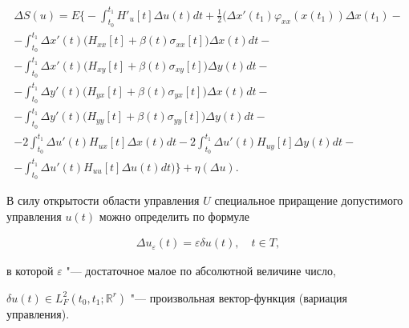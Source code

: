 \begin{multline}

\Delta S(u)=E \biggl\lbrace -\int^{t_{1}}_{t_{0}} H'_{u}[t] \Delta u(t)dt+

\frac{1}{2}  \biggl(  \Delta x'(t_{1}) \varphi_{xx}(x(t_{1})) \Delta x(t_{1})  - \\ 

- \int^{t_{1}}_{t_{0}} \Delta x'(t)\bigl(  H_{xx}[t] +\beta (t) \sigma_{xx}[t]\bigr) \Delta x(t)dt-

\\

- \int^{t_{1}}_{t_{0}} \Delta x'(t)\bigl( H_{xy}[t] +\beta (t) \sigma_{xy}[t]\bigr) \Delta y(t)dt-  \\ 

-\int^{t_{1}}_{t_{0}} \Delta y'(t)\bigl( H_{yx}[t] +\beta (t) \sigma_{yx}[t]\bigr) \Delta x(t)dt-

\\

- \int^{t_{1}}_{t_{0}} \Delta y'(t)\bigl( H_{yy}[t] +\beta (t) \sigma_{yy}[t]\bigr) \Delta y(t)dt-\\

-2\int^{t_{1}}_{t_{0}} \Delta u'(t)H_{ux}[t] \Delta x(t)dt

-

2 \int^{t_{1}}_{t_{0}} \Delta u'(t)H_{uy}[t] \Delta y(t)dt-

\\

-

\int^{t_{1}}_{t_{0}} \Delta u'(t)H_{uu}[t] \Delta u(t)dt \biggr) \biggr\rbrace +\eta(\Delta u).

 \label{mast:e14}

 \end{multline}



В силу открытости области управления $ U $ специальное приращение допустимого управления $ u(t) $  можно определить по формуле

\begin{gather}

\Delta u_{\varepsilon}(t)=\varepsilon  \delta u(t), \quad  t\in T,

 \label{mast:e15}

 \end{gather}

в которой $ \varepsilon $ "--- достаточное малое по абсолютной величине число, 

$ \delta u(t)\in L^{2}_{F}(t_{0}, t_{1}; \mathbb R^{r}) $  "--- произвольная вектор-функция (вариация управления).



